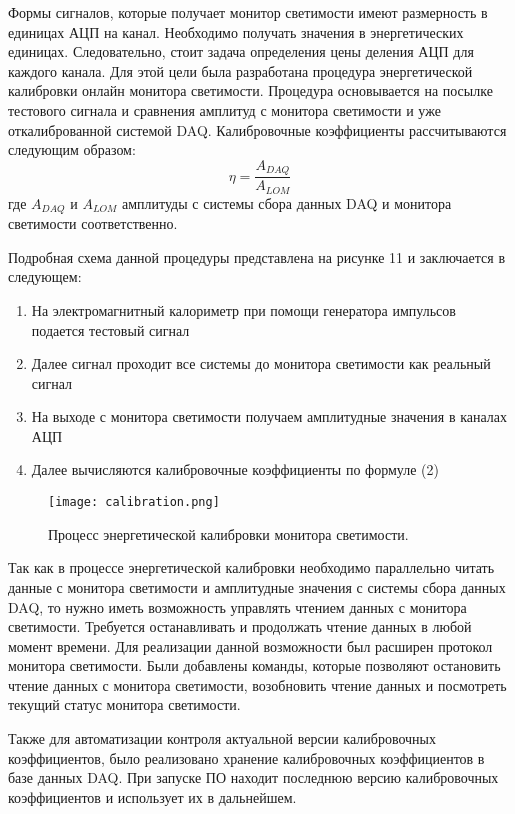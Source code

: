   Формы сигналов, которые получает монитор светимости имеют размерность в единицах АЦП на канал. Необходимо получать значения в энергетических единицах. Следовательно, стоит задача определения цены деления АЦП для каждого канала. Для этой цели была разработана процедура энергетической калибровки онлайн монитора светимости. Процедура основывается на посылке тестового сигнала и сравнения амплитуд с монитора светимости и уже откалиброванной системой DAQ. Калибровочные коэффициенты рассчитываются следующим образом:
\begin{equation}
  \eta = \frac{A_{DAQ}}{A_{LOM}}
\end{equation}
 где $A_{DAQ}$ и $A_{LOM}$ амплитуды с системы сбора данных DAQ и монитора светимости соответственно.\par
  Подробная схема данной процедуры представлена на рисунке 11 и заключается в следующем:
\begin{enumerate}
  \item На электромагнитный калориметр при помощи генератора импульсов подается тестовый сигнал
  \item Далее сигнал проходит все системы до монитора светимости как реальный сигнал
  \item На выходе с монитора светимости получаем амплитудные значения в каналах АЦП
  \item Далее вычисляются калибровочные коэффициенты по формуле (2)
\end{enumerate}\par
\begin{figure}[htp]
  \centering
  \texttt{[image: calibration.png]}
  \caption{Процесс энергетической калибровки монитора светимости.}
  \label{fig:galaxy}
\end{figure}
  Так как в процессе энергетической калибровки необходимо параллельно читать данные с монитора светимости и амплитудные значения с системы сбора данных DAQ, то нужно иметь возможность управлять чтением данных с монитора светимости. Требуется останавливать и продолжать чтение данных в любой момент времени. Для реализации данной возможности был расширен протокол монитора светимости. Были добавлены команды, которые позволяют остановить чтение данных с монитора светимости, возобновить чтение данных и посмотреть текущий статус монитора светимости.\par
  Также для автоматизации контроля актуальной версии калибровочных коэффициентов, было реализовано хранение калибровочных коэффициентов в базе данных DAQ. При запуске ПО находит последнюю версию калибровочных коэффициентов и использует их в дальнейшем.\par
